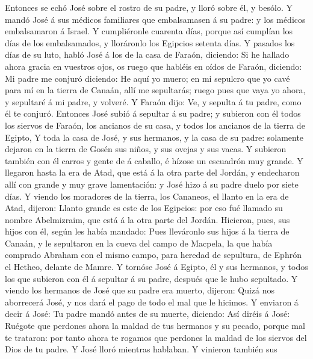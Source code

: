  Entonces se echó José sobre el rostro de su padre, y
lloró sobre él, y besólo.  Y mandó José á sus médicos
familiares que embalsamasen á su padre: y los médicos embalsamaron á
Israel.  Y cumpliéronle cuarenta días, porque así cumplían
los días de los embalsamados, y lloráronlo los Egipcios setenta días.
 Y pasados los días de su luto, habló José á los de la
casa de Faraón, diciendo: Si he hallado ahora gracia en vuestros ojos,
os ruego que habléis en oídos de Faraón, diciendo:  Mi
padre me conjuró diciendo: He aquí yo muero; en mi sepulcro que yo cavé
para mí en la tierra de Canaán, allí me sepultarás; ruego pues que vaya
yo ahora, y sepultaré á mi padre, y volveré.  Y Faraón
dijo: Ve, y sepulta á tu padre, como él te conjuró. 
Entonces José subió á sepultar á su padre; y subieron con él todos los
siervos de Faraón, los ancianos de su casa, y todos los ancianos de la
tierra de Egipto,  Y toda la casa de José, y sus hermanos,
y la casa de su padre: solamente dejaron en la tierra de Gosén sus
niños, y sus ovejas y sus vacas.  Y subieron también con
él carros y gente de á caballo, é hízose un escuadrón muy grande.
 Y llegaron hasta la era de Atad, que está á la otra
parte del Jordán, y endecharon allí con grande y muy grave lamentación:
y José hizo á su padre duelo por siete días.  Y viendo
los moradores de la tierra, los Cananeos, el llanto en la era de Atad,
dijeron: Llanto grande es este de los Egipcios: por eso fué llamado su
nombre Abelmizraim, que está á la otra parte del Jordán. 
Hicieron, pues, sus hijos con él, según les había mandado:
 Pues lleváronlo sus hijos á la tierra de Canaán, y le
sepultaron en la cueva del campo de Macpela, la que había comprado
Abraham con el mismo campo, para heredad de sepultura, de Ephrón el
Hetheo, delante de Mamre.  Y tornóse José á Egipto, él y
sus hermanos, y todos los que subieron con él á sepultar á su padre,
después que le hubo sepultado.  Y viendo los hermanos de
José que su padre era muerto, dijeron: Quizá nos aborrecerá José, y nos
dará el pago de todo el mal que le hicimos.  Y enviaron á
decir á José: Tu padre mandó antes de su muerte, diciendo:
 Así diréis á José: Ruégote que perdones ahora la maldad
de tus hermanos y su pecado, porque mal te trataron: por tanto ahora te
rogamos que perdones la maldad de los siervos del Dios de tu padre. Y
José lloró mientras hablaban.  Y vinieron también sus
